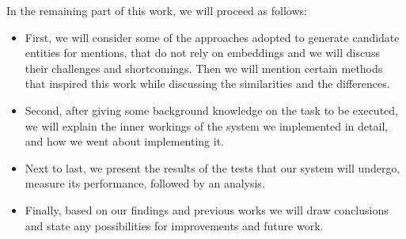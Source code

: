 In the remaining part of this work, we will proceed as follows:\newline
\begin{itemize}
\item First, we will consider some of the approaches adopted to generate candidate entities for mentions, that do not rely on embeddings and we will discuss their challenges and shortcomings. Then we will mention certain methods that inspired this work while discussing the similarities and the differences. 
\item  Second, after giving some background knowledge on the task to be executed, we will explain the inner workings of the system we implemented in detail, and how we went about implementing it. 
\item  Next to last, we present the results of the tests that our system will undergo, measure its performance, followed by an analysis.
\item  Finally, based on our findings and previous works we will draw conclusions and state any possibilities for improvements and future work.
\end{itemize}